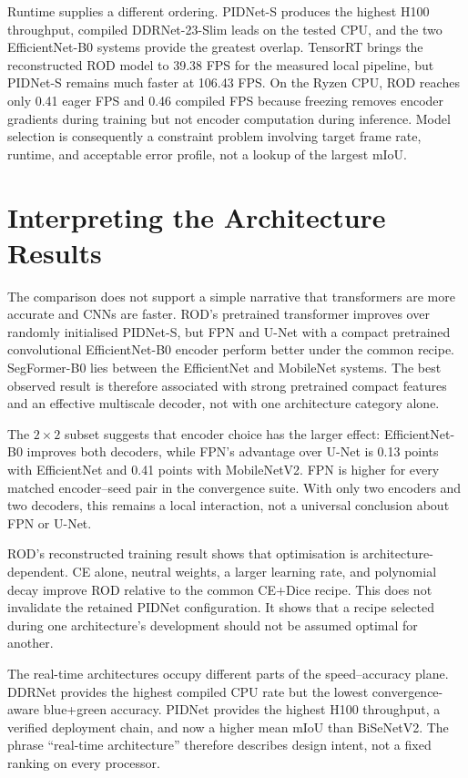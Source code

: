 Runtime supplies a different ordering. PIDNet-S produces the highest H100
throughput, compiled DDRNet-23-Slim leads on the tested CPU, and the two
EfficientNet-B0 systems provide the greatest overlap. TensorRT brings the
reconstructed ROD model to 39.38 FPS for the measured local pipeline, but
PIDNet-S remains much faster at 106.43 FPS. On the Ryzen CPU, ROD reaches only
0.41 eager FPS and 0.46 compiled FPS because freezing removes encoder gradients
during training but not encoder computation during inference. Model selection
is consequently a constraint problem involving target frame rate, runtime, and
acceptable error profile, not a lookup of the largest mIoU.

\section{Interpreting the Architecture Results}

The comparison does not support a simple narrative that transformers are more
accurate and CNNs are faster. ROD's pretrained transformer improves over
randomly initialised PIDNet-S, but FPN and U-Net with a compact pretrained
convolutional EfficientNet-B0 encoder perform better under the common recipe.
SegFormer-B0 lies between the EfficientNet and MobileNet systems. The best
observed result is therefore associated with strong pretrained compact
features and an effective multiscale decoder, not with one architecture
category alone.

The $2\times2$ subset suggests that encoder choice has the larger effect:
EfficientNet-B0 improves both decoders, while FPN's advantage over U-Net is
0.13 points with EfficientNet and 0.41 points with MobileNetV2. FPN is higher
for every matched encoder--seed pair in the convergence suite. With only two
encoders and two decoders, this remains a local interaction, not a universal
conclusion about FPN or U-Net.

ROD's reconstructed training result shows that optimisation is
architecture-dependent. CE alone, neutral weights, a larger learning rate, and
polynomial decay improve ROD relative to the common CE+Dice recipe. This does
not invalidate the retained PIDNet configuration. It shows that a recipe
selected during one architecture's development should not be assumed optimal
for another.

The real-time architectures occupy different parts of the speed--accuracy
plane. DDRNet provides the highest compiled CPU rate but the lowest
convergence-aware blue+green accuracy. PIDNet provides the highest H100
throughput, a verified deployment chain, and now a higher mean mIoU than
BiSeNetV2. The phrase ``real-time architecture'' therefore describes design
intent, not a fixed ranking on every processor.

